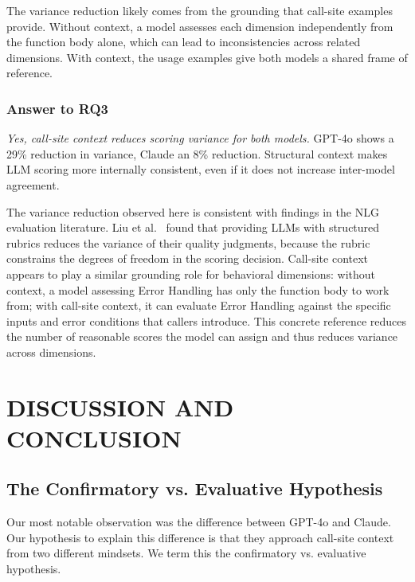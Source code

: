 \documentclass[12pt]{report}
\begin{document}
The variance reduction likely comes from the grounding that call-site examples provide. Without context, a model assesses each dimension independently from the function body alone, which can lead to inconsistencies across related dimensions. With context, the usage examples give both models a shared frame of reference.

\subsection{Answer to RQ3}

\textit{Yes, call-site context reduces scoring variance for both models.} GPT-4o shows a 29\% reduction in variance, Claude an 8\% reduction. Structural context makes LLM scoring more internally consistent, even if it does not increase inter-model agreement.

The variance reduction observed here is consistent with findings in the NLG evaluation literature. Liu et al.~\cite{liu2023geval} found that providing LLMs with structured rubrics reduces the variance of their quality judgments, because the rubric constrains the degrees of freedom in the scoring decision. Call-site context appears to play a similar grounding role for behavioral dimensions: without context, a model assessing Error Handling has only the function body to work from; with call-site context, it can evaluate Error Handling against the specific inputs and error conditions that callers introduce. This concrete reference reduces the number of reasonable scores the model can assign and thus reduces variance across dimensions.

\chapter{DISCUSSION AND CONCLUSION}

\section{The Confirmatory vs. Evaluative Hypothesis}

Our most notable observation was the difference between GPT-4o and Claude. Our hypothesis to explain this difference is that they approach call-site context from two different mindsets. We term this the confirmatory vs. evaluative hypothesis.
\end{document}
